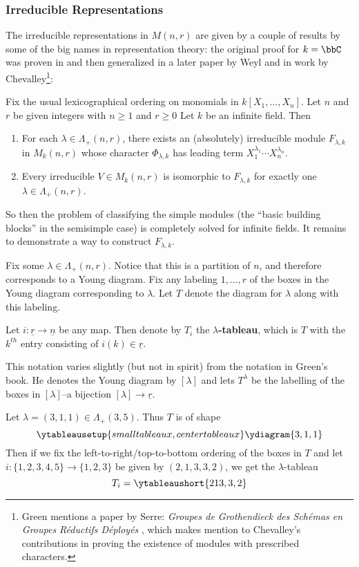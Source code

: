 \documentclass[12pt]{article}
\begin{document}
\subsubsection{Irreducible Representations}
The irreducible representations in $M(n,r)$ are given by a couple of results by some of the big names in representation theory: the original proof for $k=\bbC$ was proven in \cite[p.37]{schur-thesis} and then 
generalized in a later paper by Weyl \cite{weyl} and in work by Chevalley\footnote{Green \cite{green} mentions a paper by Serre: \textit{Groupes de Grothendieck des Sch\'emas en Groupes R\'eductifs D\'eploy\'es} \cite{serre-chevalley}, which 
makes mention to Chevalley's contributions in proving the existence of modules with prescribed characters.}:
\begin{thm}
	Fix the usual lexicographical ordering on monomials in $k[X_1,\dots,X_n]$. Let $n$ and $r$ be given integers with $n\ge 1$ and $r\ge 0$ Let $k$ be an infinite field. Then 
	\begin{enumerate}
		\item For each $\lambda\in\Lambda_+(n,r)$, there exists an (absolutely) irreducible module $F_{\lambda,k}$
		in $M_k(n,r)$ whose character $\Phi_{\lambda,k}$ has leading term $X_1^{\lambda_1}\cdots X_n^{\lambda_n}$.
		\item Every irreducible $V\in M_k(n,r)$ is isomorphic to $F_{\lambda,k}$ for exactly one $\lambda\in \Lambda_+(n,r)$.
	\end{enumerate}
\end{thm}
So then the problem of classifying the simple modules (the ``basic building blocks'' in the semisimple case) is completely solved for infinite fields.
It remains to demonstrate a way to construct $F_{\lambda,k}$.
\begin{defn}
	Fix some $\lambda\in \Lambda_+(n,r)$. Notice that this is a partition of $n$, and therefore corresponds to a Young diagram. Fix any labeling $1,\dots,r$ of the boxes in the 
	Young diagram corresponding to $\lambda$. Let $T$ denote the diagram for $\lambda$ along with this labeling.
	
	Let $i:\underline r\to\underline n$ be any map. Then denote by $T_i$ the \textbf{$\lambda$-tableau}, which is $T$ with the $k^{th}$ entry consisting of $i(k)\in\underline r$.
\end{defn}
\begin{rmk}
	This notation varies slightly (but not in spirit) from the notation in Green's book. He denotes the Young diagram by $[\lambda]$ and lets $T^\lambda$ be 
	the labelling of the boxes in $[\lambda]$--a bijection $[\lambda]\to\underline r$.
\end{rmk}
\begin{ex}
	Let $\lambda=(3,1,1)\in\Lambda_+(3,5)$. Thus $T$ is of shape 
	\[\ytableausetup{smalltableaux,centertableaux}\ydiagram{3,1,1}\]
	Then if we fix the left-to-right/top-to-bottom ordering of the boxes in $T$ and let $i:\{1,2,3,4,5\}\to\{1,2,3\}$
	be given by $(2,1,3,3,2)$, we get the $\lambda$-tableau 
	\[T_i=\ytableaushort{2 1 3, 3, 2}\]
\end{ex}
\end{document}
